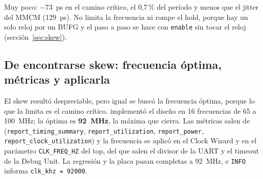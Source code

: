 Muy poco: $-73$~ps en el camino crítico, el 0,7\,\% del período y menos que el jitter del MMCM
(129~ps). No limita la frecuencia ni rompe el hold, porque hay un solo reloj por un BUFG y el paso a
paso se hace con \texttt{enable} sin tocar el reloj (sección~\ref{sec:skew}).

\subsection{De encontrarse skew: frecuencia óptima, métricas y aplicarla}

El skew resultó despreciable, pero igual se buscó la frecuencia óptima, porque lo que la limita es
el camino crítico.  implementó el diseño en 16 frecuencias de 65 a
\qty{100}{\mega\hertz}; la óptima es \textbf{\qty{92}{\mega\hertz}}, la máxima que cierra. Las
métricas salen de  (\texttt{report\_timing\_summary},
\texttt{report\_utilization}, \texttt{report\_power}, \texttt{report\_clock\_utilization}) y la
frecuencia se aplicó en el Clock Wizard y en el parámetro \texttt{CLK\_FREQ\_HZ} del top, del que
salen el divisor de la UART y el timeout de la Debug Unit. La regresión y la placa pasan completas a
\qty{92}{\mega\hertz}, e \texttt{INFO} informa \texttt{clk\_khz = 92000}.
